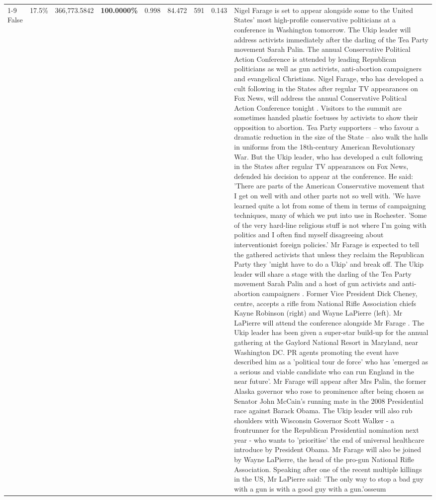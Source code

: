 \begin{table}[H]
\begin{tabular}{lllrlllll}
\cline{1-9} \cline{2-9}
False & 17.5\% & 366,773.5842 & \bfseries \color{red} 100.0000\% & 0.998 & 84.472 & 591 & 0.143 & Nigel Farage is set to appear alongside some to the United States' most high-profile conservative politicians at a conference in Washington tomorrow. The Ukip leader will address activists immediately after the darling of the Tea Party movement Sarah Palin. The annual Conservative Political Action Conference is attended by leading Republican politicians as well as gun activists, anti-abortion campaigners and evangelical Christians. Nigel Farage, who has developed a cult following in the States after regular TV appearances on Fox News, will address the annual Conservative Political Action Conference tonight . Visitors to the summit are sometimes handed plastic foetuses by activists to show their opposition to abortion. Tea Party supporters – who favour a dramatic reduction in the size of the State – also walk the halls in uniforms from the 18th-century American Revolutionary War. But the Ukip leader, who has developed a cult following in the States after regular TV appearances on Fox News, defended his decision to appear at the conference. He said: 'There are parts of the American Conservative movement that I get on well with and other parts not so well with. 'We have learned quite a lot from some of them in terms of campaigning techniques, many of which we put into use in Rochester. 'Some of the very hard-line religious stuff is not where I'm going with politics and I often find myself disagreeing about interventionist foreign policies.' Mr Farage is expected to tell the gathered activists that unless they reclaim the Republican Party they 'might have to do a Ukip' and break off. The Ukip leader will share a stage with the darling of the Tea Party movement Sarah Palin and a host of gun activists and anti-abortion campaigners . Former Vice President Dick Cheney, centre, accepts a rifle from National Rifle Association chiefs Kayne Robinson (right) and Wayne LaPierre (left). Mr LaPierre will attend the conference alongside Mr Farage . The Ukip leader has been given a super-star build-up for the annual gathering at the Gaylord National Resort in Maryland, near Washington DC. PR agents promoting the event have described him as a 'political tour de force' who has 'emerged as a serious and viable candidate who can run England in the near future'. Mr Farage will appear after Mrs Palin, the former Alaska governor who rose to prominence after being chosen as Senator John McCain's running mate in the 2008 Presidential race against Barack Obama. The Ukip leader will also rub shoulders with Wisconsin Governor Scott Walker - a frontrunner for the Republican Presidential nomination next year - who wants to 'prioritise' the end of universal healthcare introduce by President Obama. Mr Farage will also be joined by Wayne LaPierre, the head of the pro-gun National Rifle Association. Speaking after one of the recent multiple killings in the US, Mr LaPierre said: 'The only way to stop a bad guy with a gun is with a good guy with a gun.'osseum \\

\end{tabular}
\end{table}
